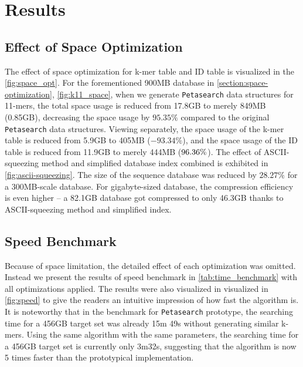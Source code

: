 \chapter{Results} \label{chapter:results}


\section{Effect of Space Optimization}

The effect of space optimization for k-mer table and ID table is visualized in the \autoref{fig:space_opt}.
For the forementioned 900MB database in \cref{section:space-optimization}, \autoref{fig:k11_space}, when we generate \texttt{Petasearch} data structures for 11-mers, the total space usage is reduced from 17.8GB to merely 849MB (0.85GB), decreasing the space usage by $95.35\%$ compared to the original \texttt{Petasearch} data structures.
Viewing separately, the space usage of the k-mer table is reduced from 5.9GB to 405MB ($-93.34\%$), and the space usage of the ID table is reduced from 11.9GB to merely 444MB ($\-96.36\%$).
The effect of ASCII-squeezing method and simplified database index combined is exhibited in \autoref{fig:ascii-squeezing}.
The size of the sequence database was reduced by $28.27 \%$ for a 300MB-scale database.
For gigabyte-sized database, the compression efficiency is even higher -- a 82.1GB database got compressed to only 46.3GB thanks to ASCII-squeezing method and simplified index.

\section{Speed Benchmark}

Because of space limitation, the detailed effect of each optimization was omitted. Instead we present the results of speed benchmark in \autoref{tab:time_benchmark} with all optimizations applied. The results were also visualized in visualized in \autoref{fig:speed} to give the readers an intuitive impression of how fast the algorithm is. It is noteworthy that in the benchmark for \texttt{Petasearch} prototype, the searching time for a 456GB target set was already 15m 49s without generating similar k-mers. Using the same algorithm with the same parameters, the searching time for a 456GB target set is currently only 3m32s, suggesting that the algorithm is now 5 times faster than the prototypical implementation.


